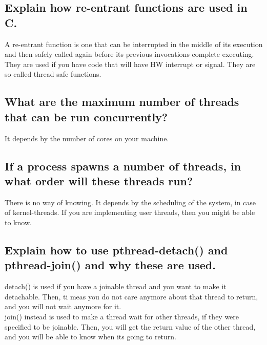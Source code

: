 \documentclass[a4paper]{article}
\begin{document}
\subsection{Explain how re-entrant functions are used in C.} %
\label{sub:Explain how re-entrant functinos are used in C.}
A re-entrant function is one that can be interrupted in the middle of its execution and then safely called again before its previous invocations complete executing. They are used if you have code that will have HW interrupt or signal. They are so called
thread safe functions.
\subsection{What are the maximum number of threads that can be run concurrently?} %
\label{sub:What are hte maxium number of threads that can be run concurrently?}
It depends by the number of cores on your machine.
\subsection{If a process spawns a number of threads, in what order will these threads run?} %
\label{sub:If a process spawns a number of threads, in what order will these threads run?}
There is no way of knowing. It depends by the scheduling of the system, in case of kernel-threads. If you are implementing
user threads, then you might be able to know.
\subsection{Explain how to use pthread-detach() and pthread-join() and why these are used.} %
\label{sub:Explain how to use pthread-detach() and pthread-join() and why these are used.}
detach() is used if you have a joinable thread and you want to make it detachable. Then, ti meas you do not care anymore about
that thread to return, and you will not wait anymore for it. \\
join() instead is used to make a thread wait for other threads, if they were specified to be joinable. Then, you will get
the return value of the other thread, and you will be able to know when its going to return.
\end{document}
